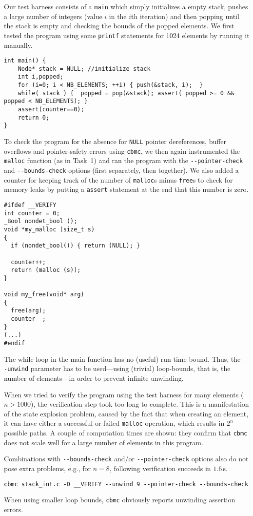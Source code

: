 Our test harness consists of a \texttt{main} which simply initializes a empty stack, pushes a large number of integers (value $i$ in the $i$th iteration) and then popping until the stack is empty and checking the bounds of the popped elements. We first tested the program using some \texttt{printf} statements for 1024 elements by running it manually.
\begin{lstlisting}
int main() {
    Node* stack = NULL; //initialize stack
    int i,popped;
    for (i=0; i < NB_ELEMENTS; ++i) { push(&stack, i);  }
    while( stack ) {  popped = pop(&stack); assert( popped >= 0 && popped < NB_ELEMENTS); }
    assert(counter==0);
    return 0;
}
\end{lstlisting}
To check the program for the absence for \texttt{NULL} pointer dereferences, buffer overflows and pointer-safety errors using \texttt{cbmc}, we then again instrumented the \texttt{malloc} function (as in Task~1) and ran the program with the \verb|--pointer-check| and \verb|--bounds-check| options (first separately, then together). We also added a counter for keeping track of the number of \texttt{malloc}s minus \texttt{free}s to check for memory leaks by putting a \texttt{assert} statement at the end that this number is zero.
\begin{lstlisting}
#ifdef __VERIFY
int counter = 0;
_Bool nondet_bool ();
void *my_malloc (size_t s)
{ 
  if (nondet_bool()) { return (NULL); }
  
  counter++;
  return (malloc (s)); 
}
 
void my_free(void* arg)
{
  free(arg);
  counter--;
}
(...)
#endif
\end{lstlisting}

The while loop in the main function has no (useful) run-time bound. Thus,
the \verb|--unwind| parameter has to be used---using (trivial) loop-bounds, that is, the number of elements---in order to prevent infinite unwinding.

When we tried to verify the program using the test harness for many elements ($n > 1000$), the verification step took too long to complete. This is a manifestation of the state explosion problem, caused by the fact that when creating an element, it can have either a successful or failed \texttt{malloc} operation, which results in $2^n$ possible paths. A couple of computation times are shown: they confirm that \texttt{cbmc} does not scale well for a large number of elements in this program.


Combinations with \verb|--bounds-check| and/or \verb|--pointer-check| options also do not pose extra problems, e.g., for $n=8$, following verification succeeds in $1.6$\,s.
\begin{Verbatim}[formatcom=\color{red}]
cbmc stack_int.c -D __VERIFY --unwind 9 --pointer-check --bounds-check
\end{Verbatim}
When using smaller loop bounds, \texttt{cbmc} obviously reports unwinding assertion errors.


